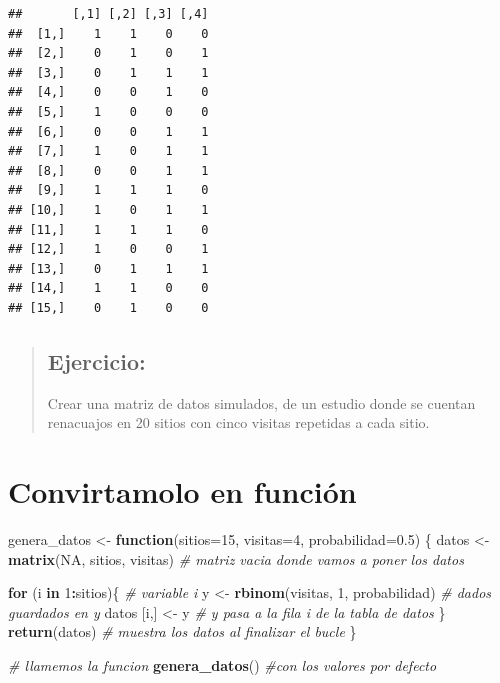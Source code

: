 \documentclass[
]{book}
\newenvironment{Shaded}{\begin{snugshade}}{\end{snugshade}}
\newcommand{\CommentTok}[1]{\textcolor[rgb]{0.56,0.35,0.01}{\textit{#1}}}
\newcommand{\ControlFlowTok}[1]{\textcolor[rgb]{0.13,0.29,0.53}{\textbf{#1}}}
\newcommand{\DataTypeTok}[1]{\textcolor[rgb]{0.13,0.29,0.53}{#1}}
\newcommand{\DecValTok}[1]{\textcolor[rgb]{0.00,0.00,0.81}{#1}}
\newcommand{\FloatTok}[1]{\textcolor[rgb]{0.00,0.00,0.81}{#1}}
\newcommand{\KeywordTok}[1]{\textcolor[rgb]{0.13,0.29,0.53}{\textbf{#1}}}
\newcommand{\NormalTok}[1]{#1}
\newcommand{\OperatorTok}[1]{\textcolor[rgb]{0.81,0.36,0.00}{\textbf{#1}}}
\newcommand{\OtherTok}[1]{\textcolor[rgb]{0.56,0.35,0.01}{#1}}
\newcommand{\StringTok}[1]{\textcolor[rgb]{0.31,0.60,0.02}{#1}}
\begin{document}
\begin{verbatim}
##       [,1] [,2] [,3] [,4]
##  [1,]    1    1    0    0
##  [2,]    0    1    0    1
##  [3,]    0    1    1    1
##  [4,]    0    0    1    0
##  [5,]    1    0    0    0
##  [6,]    0    0    1    1
##  [7,]    1    0    1    1
##  [8,]    0    0    1    1
##  [9,]    1    1    1    0
## [10,]    1    0    1    1
## [11,]    1    1    1    0
## [12,]    1    0    0    1
## [13,]    0    1    1    1
## [14,]    1    1    0    0
## [15,]    0    1    0    0
\end{verbatim}

\begin{quote}
\hypertarget{ejercicio-1}{%
\subsection{Ejercicio:}\label{ejercicio-1}}

Crear una matriz de datos simulados, de un estudio donde se cuentan renacuajos en 20 sitios con cinco visitas repetidas a cada sitio.
\end{quote}

\hypertarget{convirtamolo-en-funciuxf3n}{%
\section{Convirtamolo en función}\label{convirtamolo-en-funciuxf3n}}

\begin{Shaded}
\begin{Highlighting}[]
\NormalTok{genera_datos <-}\StringTok{ }\ControlFlowTok{function}\NormalTok{(}\DataTypeTok{sitios=}\DecValTok{15}\NormalTok{, }\DataTypeTok{visitas=}\DecValTok{4}\NormalTok{, }\DataTypeTok{probabilidad=}\FloatTok{0.5}\NormalTok{) \{}
\NormalTok{  datos <-}\StringTok{ }\KeywordTok{matrix}\NormalTok{(}\OtherTok{NA}\NormalTok{, sitios, visitas) }\CommentTok{# matriz vacia donde vamos a poner los datos}
  
  \ControlFlowTok{for}\NormalTok{ (i }\ControlFlowTok{in} \DecValTok{1}\OperatorTok{:}\NormalTok{sitios)\{     }\CommentTok{# variable i }
\NormalTok{    y <-}\StringTok{ }\KeywordTok{rbinom}\NormalTok{(visitas, }\DecValTok{1}\NormalTok{, probabilidad) }\CommentTok{# dados guardados en y}
\NormalTok{    datos [i,] <-}\StringTok{ }\NormalTok{y       }\CommentTok{# y pasa a la fila i de la tabla de datos}
\NormalTok{  \}  }
  \KeywordTok{return}\NormalTok{(datos) }\CommentTok{# muestra los datos al finalizar el bucle}
\NormalTok{\}                  }


\CommentTok{# llamemos la funcion }
\KeywordTok{genera_datos}\NormalTok{() }\CommentTok{#con los valores por defecto}
\end{Highlighting}
\end{Shaded}
\end{document}

